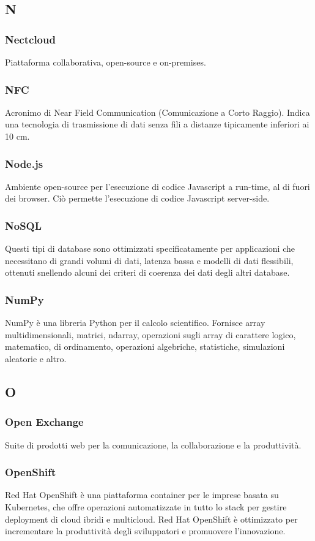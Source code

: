 \subsection*{N}
\subsubsection*{Nectcloud} Piattaforma collaborativa, open-source e on-premises.
\subsubsection*{NFC} Acronimo di Near Field Communication (Comunicazione a Corto Raggio). Indica una tecnologia di trasmissione di dati senza fili a distanze tipicamente inferiori ai 10 cm.
\subsubsection*{Node.js} Ambiente open-source per l'esecuzione di codice Javascript a run-time, al di fuori dei browser. Ciò permette l'esecuzione di codice Javascript server-side.
\subsubsection*{NoSQL} Questi tipi di database sono ottimizzati specificatamente per applicazioni che necessitano di grandi volumi di dati, latenza bassa e modelli di dati flessibili, ottenuti snellendo alcuni dei criteri di coerenza dei dati degli altri database.
\subsubsection*{NumPy} NumPy è una libreria Python per il calcolo scientifico. Fornisce array multidimensionali, matrici, ndarray, operazioni sugli array di carattere logico, matematico, di ordinamento, operazioni algebriche, statistiche, simulazioni aleatorie e altro.
\subsection*{O}
\subsubsection*{Open Exchange} Suite di prodotti web per la comunicazione, la collaborazione e la produttività.
\subsubsection*{OpenShift} Red Hat OpenShift è una piattaforma container per le imprese basata su Kubernetes, che offre operazioni automatizzate in tutto lo stack per gestire deployment di cloud ibridi e multicloud. Red Hat OpenShift è ottimizzato per incrementare la produttività degli sviluppatori e promuovere l'innovazione. 
